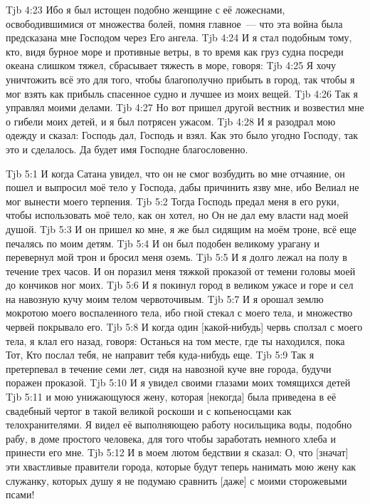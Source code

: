 \vs Tjb 4:23
Ибо я был истощен подобно женщине с её ложеснами, освободившимися от множества болей, помня главное~--- что эта война была предсказана мне Господом через Его ангела.
\vs Tjb 4:24
И я стал подобным тому, кто, видя бурное море и противные ветры, в то время как груз судна посреди океана слишком тяжел, сбрасывает тяжесть в море, говоря:
\vs Tjb 4:25
Я хочу уничтожить всё это для того, чтобы благополучно прибыть в город, так чтобы я мог взять как прибыль спасенное судно и лучшее из моих вещей.
\vs Tjb 4:26
Так я управлял моими делами.
\vs Tjb 4:27
Но вот пришел другой вестник и возвестил мне о гибели моих детей, и я был потрясен ужасом.
\vs Tjb 4:28
И я разодрал мою одежду и сказал: Господь дал, Господь и взял. Как это было угодно Господу, так это и сделалось. Да будет имя Господне благословенно.

\vs Tjb 5:1
И когда Сатана увидел, что он не смог возбудить во мне отчаяние, он пошел и выпросил моё тело у Господа, дабы причинить язву мне, ибо Велиал не мог вынести моего терпения.
\vs Tjb 5:2
Тогда Господь предал меня в его руки, чтобы использовать моё тело, как он хотел, но Он не дал ему власти над моей душой.
\vs Tjb 5:3
И он пришел ко мне, я же был сидящим на моём троне, всё еще печалясь по моим детям.
\vs Tjb 5:4
И он был подобен великому урагану и перевернул мой трон и бросил меня оземь.
\vs Tjb 5:5
И я долго лежал на полу в течение трех часов. И он поразил меня тяжкой проказой от темени головы моей до кончиков ног моих.
\vs Tjb 5:6
И я покинул город в великом ужасе и горе и сел на навозную кучу моим телом червоточивым.
\vs Tjb 5:7
И я орошал землю мокротою моего воспаленного тела, ибо гной стекал с моего тела, и множество червей покрывало его.
\vs Tjb 5:8
И когда один [какой-нибудь] червь сползал с моего тела, я клал его назад, говоря: Останься на том месте, где ты находился, пока Тот, Кто послал тебя, не направит тебя куда-нибудь еще.
\vs Tjb 5:9
Так я претерпевал в течение семи лет, сидя на навозной куче вне города, будучи поражен проказой.
\vs Tjb 5:10
И я увидел своими глазами моих томящихся детей
\vs Tjb 5:11
и мою унижающуюся жену, которая [некогда] была приведена в её свадебный чертог в такой великой роскоши и с копьеносцами как телохранителями. Я видел её выполняющею работу носильщика воды, подобно рабу, в доме простого человека, для того чтобы заработать немного хлеба и принести его мне.
\vs Tjb 5:12
И в моем лютом бедствии я сказал: О, что [значат] эти хвастливые правители города, которые будут теперь нанимать мою жену как служанку, которых душу я не подумаю сравнить [даже] с моими сторожевыми псами!
